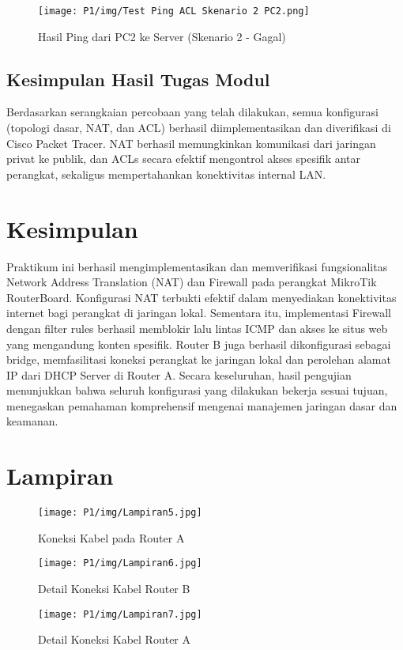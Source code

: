 \begin{figure}[H]
    \centering
        \texttt{[image: P1/img/Test Ping ACL Skenario 2 PC2.png]}
        \caption{Hasil Ping dari PC2 ke Server (Skenario 2 - Gagal)}
        \label{fig:ping_acl2_pc2}
\end{figure}

\subsection{Kesimpulan Hasil Tugas Modul}
Berdasarkan serangkaian percobaan yang telah dilakukan, semua konfigurasi (topologi dasar, NAT, dan ACL) berhasil diimplementasikan dan diverifikasi di Cisco Packet Tracer. NAT berhasil memungkinkan komunikasi dari jaringan privat ke publik, dan ACLs secara efektif mengontrol akses spesifik antar perangkat, sekaligus mempertahankan konektivitas internal LAN.

\section{Kesimpulan}

Praktikum ini berhasil mengimplementasikan dan memverifikasi fungsionalitas Network Address Translation (NAT) dan Firewall pada perangkat MikroTik RouterBoard. Konfigurasi NAT terbukti efektif dalam menyediakan konektivitas internet bagi perangkat di jaringan lokal. Sementara itu, implementasi Firewall dengan filter rules berhasil memblokir lalu lintas ICMP dan akses ke situs web yang mengandung konten spesifik. Router B juga berhasil dikonfigurasi sebagai bridge, memfasilitasi koneksi perangkat ke jaringan lokal dan perolehan alamat IP dari DHCP Server di Router A. Secara keseluruhan, hasil pengujian menunjukkan bahwa seluruh konfigurasi yang dilakukan bekerja sesuai tujuan, menegaskan pemahaman komprehensif mengenai manajemen jaringan dasar dan keamanan.

\section{Lampiran}

\begin{figure}[H]
    \centering
    \begin{minipage}[t]{0.48\textwidth}
        \centering
        \texttt{[image: P1/img/Lampiran5.jpg]}
        \caption{Koneksi Kabel pada Router A}
        \label{fig:lampiran5}
    \end{minipage}
    \hfill
    \begin{minipage}[t]{0.48\textwidth}
        \centering
        \texttt{[image: P1/img/Lampiran6.jpg]}
        \caption{Detail Koneksi Kabel Router B}
        \label{fig:lampiran6}
    \end{minipage}
\end{figure}

\begin{figure}[H]
    \centering
    \begin{minipage}[t]{0.48\textwidth}
        \centering
        \texttt{[image: P1/img/Lampiran7.jpg]}
        \caption{Detail Koneksi Kabel Router A}
        \label{fig:lampiran7}
    \end{minipage}
\end{figure}